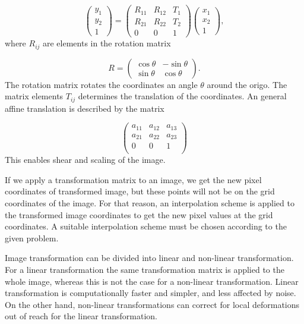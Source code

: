 \begin{equation}
	\label{rigid}
	\begin{pmatrix}
		y_1 \\
		y_2 \\
		1 
	\end{pmatrix}
	=
	\begin{pmatrix}
		R_{11} & R_{12} & T_1\\
		R_{21} & R_{22} & T_2\\		
		0 & 0 & 1
	\end{pmatrix}
	\begin{pmatrix}
		x_1\\
		x_2\\
		1
	\end{pmatrix},
\end{equation}
where $R_{ij}$ are elements in the rotation matrix 

\begin{equation}
	R = 
	\begin{pmatrix}
	\cos \theta & -\sin \theta\\
	\sin \theta & \cos \theta
	\end{pmatrix}.
\end{equation}
The rotation matrix rotates the coordinates an angle $\theta$ around the origo. The matrix elements $T_{ij}$ determines the translation of the coordinates. An general affine translation is described by the matrix

\begin{equation}
\begin{pmatrix}
 a_{11}&a_{12}&a_{13}\\
 a_{21}&a_{22}&a_{23}\\
 0&0&1\\
 
\end{pmatrix}
\end{equation} 
This enables shear and scaling of the image.

If we apply a transformation matrix to an image, we get the new pixel coordinates of transformed image, but these points will not be on the grid coordinates of the image. For that reason, an interpolation scheme is applied to the transformed image coordinates to get the new pixel values at the grid coordinates. A suitable interpolation scheme must be chosen according to the given problem.

Image transformation can be divided into linear and non-linear transformation. For a linear transformation the same transformation matrix is applied to the whole image, whereas this is not the case for a non-linear transformation. Linear transformation is computationally faster and simpler, and less affected by noise. On the other hand, non-linear transformations can correct for local deformations out of reach for the linear transformation. 

